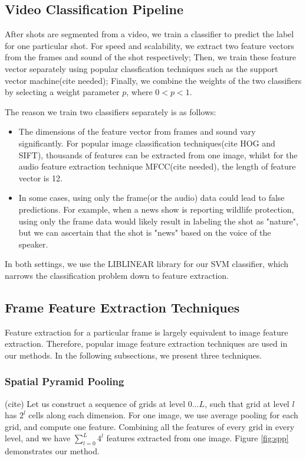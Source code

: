 \subsection{Video Classification Pipeline}
After shots are segmented from a video, we train a classifier to predict the label for one particular shot. For speed and scalability, we extract two feature vectors from the frames and sound of the shot respectively; Then, we train these feature vector separately using popular classfication techniques such as the support vector machine(cite needed); Finally, we combine the weights of the two classifiers by selecting a weight parameter $p$, where $0 < p < 1$. \par
The reason we train two classifiers separately is as follows:
\begin{itemize}
\item The dimensions of the feature vector from frames and sound vary significantly. For popular image classification techniques(cite HOG and SIFT), thousands of features can be extracted from one image, whilst for the audio feature extraction technique MFCC(cite needed), the length of feature vector is 12.
\item In some cases, using only the frame(or the audio) data could lead to false predictions. For example, when a news show is reporting wildlife protection, using only the frame data would likely result in labeling the shot as "nature", but we can ascertain that the shot is "news" based on the voice of the speaker.
\end{itemize}
In both settings, we use the LIBLINEAR library for our SVM classifier, which narrows the classification problem down to feature extraction.
\subsection{Frame Feature Extraction Techniques}
Feature extraction for a particular frame is largely equivalent to image feature extraction. Therefore, popular image feature extraction techniques are used in our methods. In the following subsections, we present three techniques.
\subsubsection{Spatial Pyramid Pooling}(cite)
Let us construct a sequence of grids at level $0 \ldots L$, such that grid at level $l$ has $2^l$ cells along each dimension. For one image, we use average pooling for each grid, and compute one feature. Combining all the features of every grid in every level, and we have $\sum_{l=0}^{L} 4^l$ features extracted from one image. Figure \ref{fig:spp} demonstrates our method.

